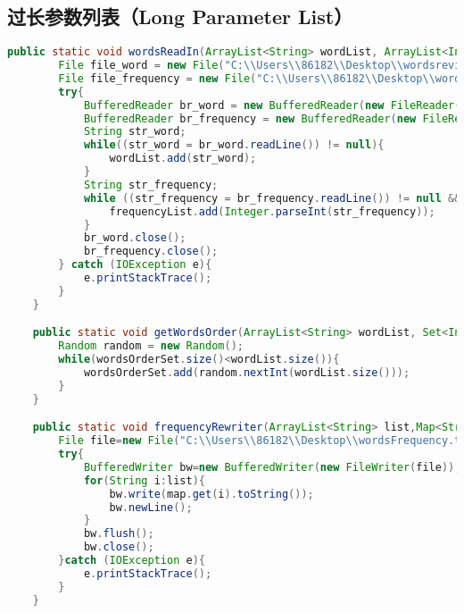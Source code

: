 \documentclass[a4paper]{article}
\begin{document}
\subsection{过长参数列表（Long Parameter List）}
\begin{lstlisting}[language={java}]
    public static void wordsReadIn(ArrayList<String> wordList, ArrayList<Integer> frequencyList){
        File file_word = new File("C:\\Users\\86182\\Desktop\\wordsreview.txt");
        File file_frequency = new File("C:\\Users\\86182\\Desktop\\wordsFrequency.txt");
        try{
            BufferedReader br_word = new BufferedReader(new FileReader(file_word));
            BufferedReader br_frequency = new BufferedReader(new FileReader(file_frequency));
            String str_word;
            while((str_word = br_word.readLine()) != null){
                wordList.add(str_word);
            }
            String str_frequency;
            while ((str_frequency = br_frequency.readLine()) != null && !str_frequency.equals("")){
                frequencyList.add(Integer.parseInt(str_frequency));
            }
            br_word.close();
            br_frequency.close();
        } catch (IOException e){
            e.printStackTrace();
        }
    }

    public static void getWordsOrder(ArrayList<String> wordList, Set<Integer> wordsOrderSet){
        Random random = new Random();
        while(wordsOrderSet.size()<wordList.size()){
            wordsOrderSet.add(random.nextInt(wordList.size()));
        }
    }

    public static void frequencyRewriter(ArrayList<String> list,Map<String,Integer> map){
        File file=new File("C:\\Users\\86182\\Desktop\\wordsFrequency.txt");
        try{
            BufferedWriter bw=new BufferedWriter(new FileWriter(file));
            for(String i:list){
                bw.write(map.get(i).toString());
                bw.newLine();
            }
            bw.flush();
            bw.close();
        }catch (IOException e){
            e.printStackTrace();
        }
    }
\end{lstlisting}
\end{document}
